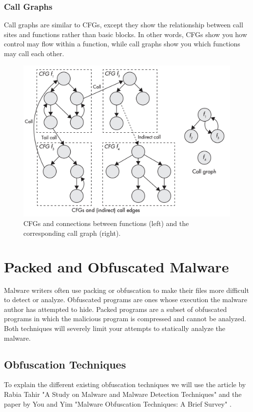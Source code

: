 \subsubsection{Call Graphs}
Call graphs are similar to CFGs, except they show the relationship between call sites and functions rather than basic blocks. In other words, CFGs show you how control may flow within a function, while call graphs show you which functions may call each other.

\begin{figure}[H]
    \centering
    \includegraphics[width=0.8\linewidth]{Images/CallGraph.png}
    \caption{CFGs and connections between functions (left) and the corresponding call graph (right).}
    \label{fig:CallGraph}
\end{figure}

\section{Packed and Obfuscated Malware}
Malware writers often use packing or obfuscation to make their files more difficult to detect or analyze. Obfuscated programs are ones whose execution the malware author has attempted to hide. Packed programs are a subset of obfuscated programs in which the malicious program is compressed and cannot be analyzed. Both techniques will severely limit your attempts to statically analyze the malware.

\subsection{Obfuscation Techniques}
To explain the different existing obfuscation techniques we will use the article by Rabia Tahir "A Study on Malware and Malware Detection Techniques" \cite{tahir2018study} and the paper by You and Yim "Malware Obfuscation Techniques: A Brief Survey" \cite{you2010malware}. 


